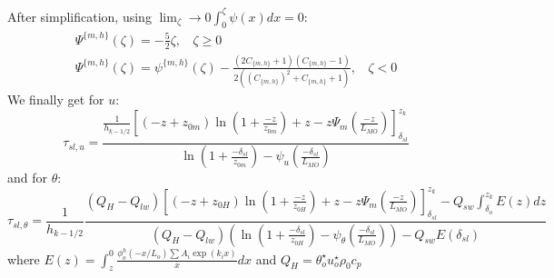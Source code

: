 After simplification, using $\lim_\zeta\to0 \int_0^\zeta\psi(x)dx = 0$:
\begin{equation}
\begin{aligned}
\Psi^{\{m,h\}}(\zeta)= -\frac{5}{2}\zeta, ~~~~ \zeta \geq 0 \\
	\Psi^{\{m,h\}}(\zeta)=
	\psi^{\{m,h\}}(\zeta)
	- \frac{(2C_{\{m,h\}}+1)(C_{\{m,h\}} - 1)}
	{2\left((C_{\{m,h\}})^2 + C_{\{m,h\}} + 1\right)}, ~~~~ \zeta < 0
\end{aligned}
\end{equation}
We finally get for $u$:
\begin{equation}
	\tau_{sl, u} = \frac{\frac{1}{{h_{k-1/2}}}
    \left[
	    (-z+z_{0m})\ln(1+\frac{-z}{z_{0m}})+z
    -
    z \Psi_m(\frac{-z}{L_{MO}}) \right]_{\delta_{sl}}^{z_k}
    }{\ln(1+\frac{-\delta_{sl}}{z_{0m}})- \psi_u(\frac{-\delta_{sl}}{L_{MO}})
    }
\end{equation}
and for $\theta$:
\begin{equation}
	\tau_{sl, \theta} =  \frac{1}{{h_{k-1/2}}}\frac{(Q_H -
		Q_{lw})
    \left[
	    (-z+z_{0H})\ln(1+\frac{-z}{z_{0H}})+z
    -
    z \Psi_m(\frac{-z}{L_{MO}}) \right]_{\delta_{sl}}^{z_k}
	- Q_{sw} \int_{\delta_o}^{z_k}
		E(z) dz
    }{(Q_H - Q_{lw})
	    \left(\ln(1+\frac{-\delta_{sl}}{z_{0H}})-
	    \psi_\theta(\frac{-\delta_{sl}}{L_{MO}})\right)
	    -Q_{sw} E(\delta_{sl})
    }
\end{equation}
where $E(z) = \int_{z}^0 \frac{\phi^h_o(-x/L_o)
		\sum A_i \exp (k_i x)
		}{x}dx$
and $Q_H = \theta_o^{\star}u_o^{\star}\rho_0 c_p$


